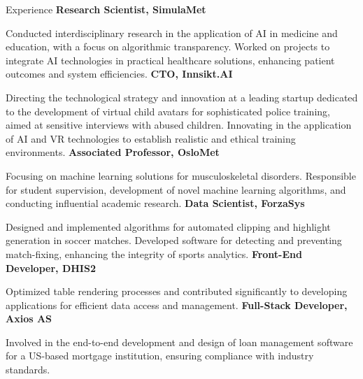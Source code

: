 \begin{rubric}{Experience}
%
\entry*[2021 -- present]%
\textbf{Research Scientist, SimulaMet} \par
Conducted interdisciplinary research in the application of AI in medicine and education, with a focus on algorithmic transparency.
Worked on projects to integrate AI technologies in practical healthcare solutions, enhancing patient outcomes and system efficiencies.
%
\entry*[2023 -- present]%
\textbf{CTO, Innsikt.AI} \par
Directing the technological strategy and innovation at a leading startup dedicated to the development of virtual child avatars for sophisticated police training, aimed at sensitive interviews with abused children.
Innovating in the application of AI and VR technologies to establish realistic and ethical training environments.
%
\entry*[2023 -- present]%
\textbf{Associated Professor, OsloMet} \par
Focusing on machine learning solutions for musculoskeletal disorders.
Responsible for student supervision, development of novel machine learning algorithms, and conducting influential academic research.
%
\entry*[2022 -- 2023]%
\textbf{Data Scientist, ForzaSys} \par
Designed and implemented algorithms for automated clipping and highlight generation in soccer matches.
Developed software for detecting and preventing match-fixing, enhancing the integrity of sports analytics.
%
\entry*[2017 -- 2018]%
\textbf{Front-End Developer, DHIS2} \par
Optimized table rendering processes and contributed significantly to developing applications for efficient data access and management.
%
\entry*[2014 -- 2016]%
\textbf{Full-Stack Developer, Axios AS} \par
Involved in the end-to-end development and design of loan management software for a US-based mortgage institution, ensuring compliance with industry standards.
%
\end{rubric}